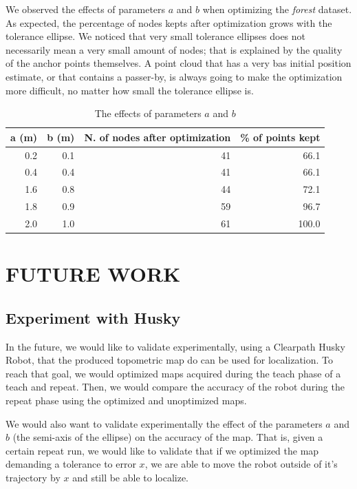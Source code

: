 \documentclass[letterpaper,10 pt,conference]{ieeeconf}
\begin{document}
We observed the effects of parameters $a$ and $b$ when optimizing the \textit{forest} dataset. As
expected, the percentage of nodes kepts after optimization grows with the tolerance ellipse. We
noticed that very small tolerance ellipses does not necessarily mean a very small amount of nodes;
that is explained by the quality of the anchor points themselves. A point cloud that has a very bas
initial position estimate, or that contains a passer-by, is always going to make the optimization
more difficult, no matter how small the tolerance ellipse is.

\begin{table}[h]
\centering
\begin{tabular}{|r|r|r|r|}
  \hline
a (m) & b (m) &  N. of nodes after optimization & \% of points kept \\
\hline
  0.2 & 0.1 & 41 & 66.1  \\
\hline
 0.4 & 0.4 & 41 & 66.1 \\
  \hline
 1.6 & 0.8 & 44 & 72.1 \\
  \hline
1.8 & 0.9 & 59 & 96.7 \\
  \hline
  2.0 & 1.0 & 61 & 100.0 \\
  \hline
\end{tabular}
\caption{The effects of parameters $a$ and $b$}
\label{tabopti}
\end{table}

\section{FUTURE WORK}

\subsection{Experiment with Husky}
In the future, we would like to validate experimentally, using a Clearpath Husky Robot, that the produced topometric map do can be used for localization.
To reach that goal, we would optimized maps acquired during the teach phase of a teach and repeat. Then, we would compare
the accuracy of the robot during the repeat phase using the optimized and unoptimized maps.

We would also want to validate experimentally the effect of the parameters $a$ and $b$ (the semi-axis of the ellipse)
on the accuracy of the map. That is, given a certain repeat run, we would like to validate that if
we optimized the map demanding a tolerance to error $x$, we are able to move the robot outside of
it's trajectory by $x$ and still be able to localize.
\end{document}
